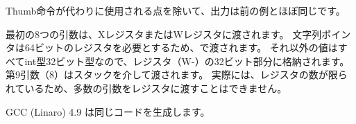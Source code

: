 Thumb命令が代わりに使用される点を除いて、出力は前の例とほぼ同じです。





最初の8つの引数は、XレジスタまたはWレジスタに渡されます。 \ARMPCS
文字列ポインタは64ビットのレジスタを必要とするため、で渡されます。 
それ以外の値はすべてint型32ビット型なので、レジスタ（W-）の32ビット部分に格納されます。 
第9引数（8）はスタックを介して渡されます。 
実際には、レジスタの数が限られているため、多数の引数をレジスタに渡すことはできません。

\Optimizing GCC (Linaro) 4.9 は同じコードを生成します。
